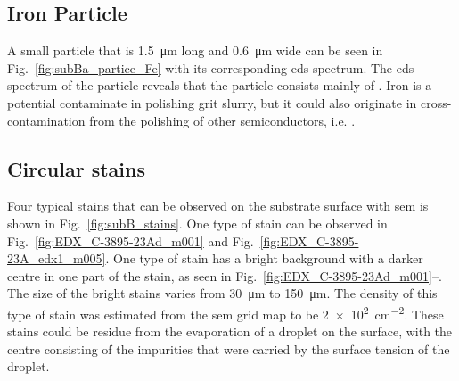 \subsection{Iron Particle}
A small particle that is \SI{1.5}{\micro\metre} long and \SI{0.6}{\micro\metre} wide can be seen in Fig.~\ref{fig:subBa_partice_Fe} with its corresponding \ac{eds} spectrum. The \ac{eds} spectrum of the particle reveals that the particle consists mainly of . Iron is a potential contaminate in polishing grit slurry, but it could also originate in cross-contamination from the polishing of other semiconductors, i.e.  \citep{benson2015as-received}.

\subsection{Circular stains}
Four typical stains that can be observed on the substrate surface with \ac{sem} is shown in Fig.~\ref{fig:subB_stains}. One type of stain can be observed in Fig.~\ref{fig:EDX_C-3895-23Ad_m001} and Fig.~\ref{fig:EDX_C-3895-23A_edx1_m005}. One type of stain has a bright background with a darker centre in one part of the stain, as seen in Fig.~\ref{fig:EDX_C-3895-23Ad_m001}--. The size of the bright stains varies from \SI{30}{\micro\metre} to \SI{150}{\micro\metre}. The density of this type of stain was estimated from the \ac{sem} grid map to be \SI{2e2}{\centi\metre^{-2}}. These stains could be residue from the evaporation of a droplet on the surface, with the centre consisting of the impurities that were carried by the surface tension of the droplet. %

